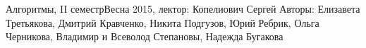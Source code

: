 


\BigHeader
    {Алгоритмы, II семестр}{Весна 2015, лектор: Копелиович Сергей}
    {Авторы: Елизавета Третьякова, Дмитрий Кравченко, Никита Подгузов, Юрий Ребрик, Ольга Черникова, Владимир и Всеволод Степановы, Надежда Бугакова}













